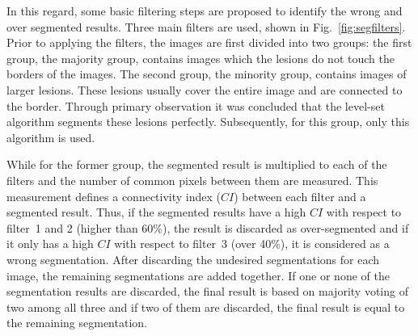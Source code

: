 \begin{description}
In this regard, some basic filtering steps are proposed to identify the wrong and over segmented results.
Three main filters are used, shown in Fig.~\ref{fig:segfilters}.
Prior to applying the filters, the images are first divided into two groups: the first group, the majority group, contains images which the lesions do not touch the borders of the images.
The second group, the minority group, contains images of larger lesions.
These lesions usually cover the entire image and are connected to the border.
Through primary observation it was concluded that the level-set algorithm segments these lesions perfectly.
Subsequently, for this group, only this algorithm is used.

While for the former group, the segmented result is multiplied to each of the filters and the number of common pixels between them are measured.
This measurement defines a connectivity index ($CI$) between each filter and a segmented result.
Thus, if the segmented results have a high $CI$ with respect to filter~1 and 2 (higher than 60\%), the result is discarded as over-segmented and if it only has a high $CI$ with respect to filter~3 (over 40\%), it is considered as a wrong segmentation.
After discarding the undesired segmentations for each image, the remaining segmentations are added together.
If one or none of the segmentation results are discarded, the final result is based on majority voting of two among all three and if two of them are discarded, the final result is equal to the remaining segmentation.

\end{description}



